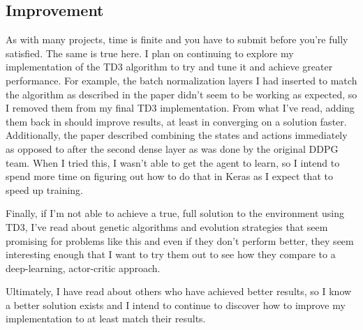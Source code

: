\documentclass{article}
\begin{document}
\subsection{Improvement}
As with many projects, time is finite and you have to submit before you're fully satisfied. The same is true here. I plan on continuing to explore my implementation of the TD3 algorithm to try and tune it and achieve greater performance. For example, the batch normalization layers I had inserted to match the algorithm as described in the paper didn't seem to be working as expected, so I removed them from my final TD3 implementation. From what I've read, adding them back in should improve results, at least in converging on a solution faster. Additionally, the paper described combining the states and actions immediately as opposed to after the second dense layer as was done by the original DDPG team. When I tried this, I wasn't able to get the agent to learn, so I intend to spend more time on figuring out how to do that in Keras as I expect that to speed up training.

Finally, if I'm not able to achieve a true, full solution to the environment using TD3, I've read about genetic algorithms and evolution strategies that seem promising for problems like this and even if they don't perform better, they seem interesting enough that I want to try them out to see how they compare to a deep-learning, actor-critic approach.

Ultimately, I have read about others who have achieved better results, so I know a better solution exists and I intend to continue to discover how to improve my implementation to at least match their results.

  

\end{document}
